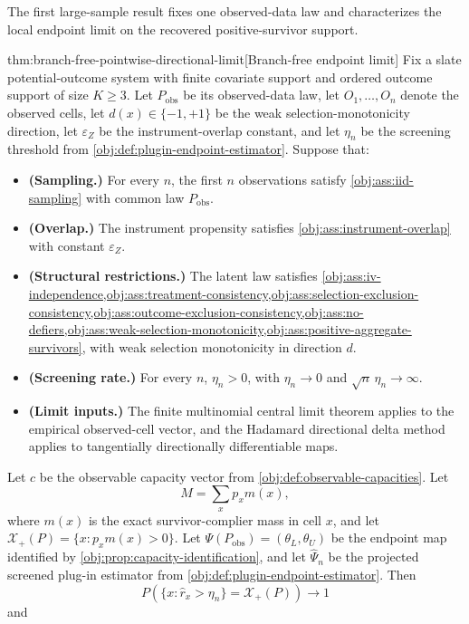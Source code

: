 \documentclass[11pt]{article}
\begin{document}
The first large-sample result fixes one observed-data law and characterizes the local endpoint limit on the recovered positive-survivor support.

\begin{theoremv}{thm:branch-free-pointwise-directional-limit}[Branch-free endpoint limit]
Fix a slate potential-outcome system with finite covariate support and ordered outcome support of size \(K\ge 3\).  Let \(P_{\mathrm{obs}}\) be its observed-data law, let \(O_1,\ldots,O_n\) denote the observed cells, let \(d(x)\in\{-1,+1\}\) be the weak selection-monotonicity direction, let \(\varepsilon_Z\) be the instrument-overlap constant, and let \(\eta_n\) be the screening threshold from \cref{obj:def:plugin-endpoint-estimator}.  Suppose that:
\begin{itemize}
\item \textbf{(Sampling.)} For every \(n\), the first \(n\) observations satisfy \cref{obj:ass:iid-sampling} with common law \(P_{\mathrm{obs}}\).
\item \textbf{(Overlap.)} The instrument propensity satisfies \cref{obj:ass:instrument-overlap} with constant \(\varepsilon_Z\).
\item \textbf{(Structural restrictions.)} The latent law satisfies \cref{obj:ass:iv-independence,obj:ass:treatment-consistency,obj:ass:selection-exclusion-consistency,obj:ass:outcome-exclusion-consistency,obj:ass:no-defiers,obj:ass:weak-selection-monotonicity,obj:ass:positive-aggregate-survivors}, with weak selection monotonicity in direction \(d\).
\item \textbf{(Screening rate.)} For every \(n\), \(\eta_n>0\), with \(\eta_n\to0\) and \(\sqrt n\,\eta_n\to\infty\).
\item \textbf{(Limit inputs.)} The finite multinomial central limit theorem applies to the empirical observed-cell vector, and the Hadamard directional delta method applies to tangentially directionally differentiable maps.
\end{itemize}
Let \(c\) be the observable capacity vector from \cref{obj:def:observable-capacities}.  Let
\[
M=\sum_x p_x m(x),
\]
where \(m(x)\) is the exact survivor-complier mass in cell \(x\), and let \(\mathcal X_+(P)=\{x:p_xm(x)>0\}\).  Let \(\Psi(P_{\mathrm{obs}})=(\theta_L,\theta_U)\) be the endpoint map identified by \cref{obj:prop:capacity-identification}, and let \(\widehat\Psi_n\) be the projected screened plug-in estimator from \cref{obj:def:plugin-endpoint-estimator}.  Then
\[
P\!\left(\{x:\widehat r_x>\eta_n\}=\mathcal X_+(P)\right)\to 1
\]
and

\end{theoremv}
\end{document}
